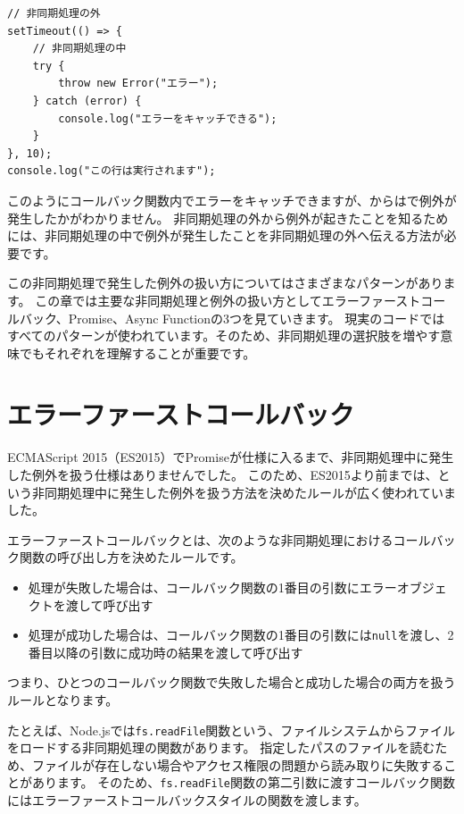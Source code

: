 \begin{lstlisting}
// 非同期処理の外
setTimeout(() => {
    // 非同期処理の中
    try {
        throw new Error("エラー");
    } catch (error) {
        console.log("エラーをキャッチできる");
    }
}, 10);
console.log("この行は実行されます");
\end{lstlisting}

このようにコールバック関数内でエラーをキャッチできますが、\textbf{}からは\textbf{}で例外が発生したかがわかりません。
非同期処理の外から例外が起きたことを知るためには、非同期処理の中で例外が発生したことを非同期処理の外へ伝える方法が必要です。

この非同期処理で発生した例外の扱い方についてはさまざまなパターンがあります。
この章では主要な非同期処理と例外の扱い方としてエラーファーストコールバック、Promise、Async
Functionの3つを見ていきます。
現実のコードではすべてのパターンが使われています。そのため、非同期処理の選択肢を増やす意味でもそれぞれを理解することが重要です。

\hypertarget{error-first-callback}{%
\section{エラーファーストコールバック}\label{error-first-callback}}

ECMAScript
2015（ES2015）でPromiseが仕様に入るまで、非同期処理中に発生した例外を扱う仕様はありませんでした。
このため、ES2015より前までは、\textbf{}という非同期処理中に発生した例外を扱う方法を決めたルールが広く使われていました。

エラーファーストコールバックとは、次のような非同期処理におけるコールバック関数の呼び出し方を決めたルールです。

\begin{itemize}
\item
  処理が失敗した場合は、コールバック関数の1番目の引数にエラーオブジェクトを渡して呼び出す
\item
  処理が成功した場合は、コールバック関数の1番目の引数には\texttt{null}を渡し、2番目以降の引数に成功時の結果を渡して呼び出す
\end{itemize}

つまり、ひとつのコールバック関数で失敗した場合と成功した場合の両方を扱うルールとなります。

たとえば、Node.jsでは\texttt{fs.readFile}関数という、ファイルシステムからファイルをロードする非同期処理の関数があります。
指定したパスのファイルを読むため、ファイルが存在しない場合やアクセス権限の問題から読み取りに失敗することがあります。
そのため、\texttt{fs.readFile}関数の第二引数に渡すコールバック関数にはエラーファーストコールバックスタイルの関数を渡します。

